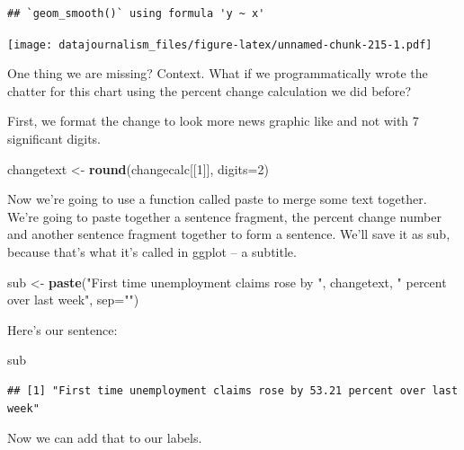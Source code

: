 \documentclass[]{book}
\newenvironment{Shaded}{\begin{snugshade}}{\end{snugshade}}
\newcommand{\DataTypeTok}[1]{\textcolor[rgb]{0.13,0.29,0.53}{#1}}
\newcommand{\DecValTok}[1]{\textcolor[rgb]{0.00,0.00,0.81}{#1}}
\newcommand{\KeywordTok}[1]{\textcolor[rgb]{0.13,0.29,0.53}{\textbf{#1}}}
\newcommand{\NormalTok}[1]{#1}
\newcommand{\StringTok}[1]{\textcolor[rgb]{0.31,0.60,0.02}{#1}}
\begin{document}
\begin{verbatim}
## `geom_smooth()` using formula 'y ~ x'
\end{verbatim}

\texttt{[image: datajournalism\_files/figure-latex/unnamed-chunk-215-1.pdf]}

One thing we are missing? Context. What if we programmatically wrote the chatter for this chart using the percent change calculation we did before?

First, we format the change to look more news graphic like and not with 7 significant digits.

\begin{Shaded}
\begin{Highlighting}[]
\NormalTok{changetext <-}\StringTok{ }\KeywordTok{round}\NormalTok{(changecalc[[}\DecValTok{1}\NormalTok{]], }\DataTypeTok{digits=}\DecValTok{2}\NormalTok{)}
\end{Highlighting}
\end{Shaded}

Now we're going to use a function called paste to merge some text together. We're going to paste together a sentence fragment, the percent change number and another sentence fragment together to form a sentence. We'll save it as sub, because that's what it's called in ggplot -- a subtitle.

\begin{Shaded}
\begin{Highlighting}[]
\NormalTok{sub <-}\StringTok{ }\KeywordTok{paste}\NormalTok{(}\StringTok{"First time unemployment claims rose by "}\NormalTok{, changetext, }\StringTok{" percent over last week"}\NormalTok{, }\DataTypeTok{sep=}\StringTok{""}\NormalTok{)}
\end{Highlighting}
\end{Shaded}

Here's our sentence:

\begin{Shaded}
\begin{Highlighting}[]
\NormalTok{sub}
\end{Highlighting}
\end{Shaded}

\begin{verbatim}
## [1] "First time unemployment claims rose by 53.21 percent over last week"
\end{verbatim}

Now we can add that to our labels.
\end{document}
